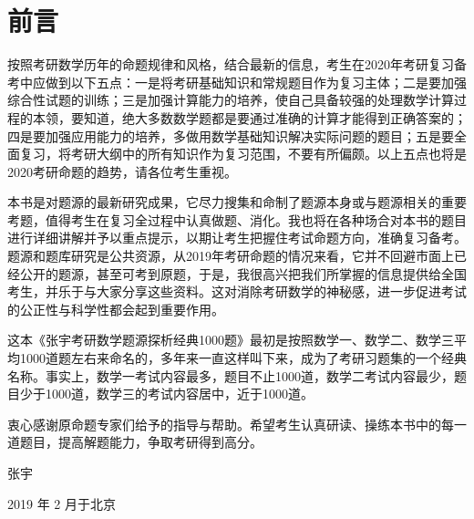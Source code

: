 	\onecolumn
	\chapter{前言}

	按照考研数学历年的命题规律和风格，结合最新的信息，考生在2020年考研复习备考中应做到以下五点：一是将考研基础知识和常规题目作为复习主体；二是要加强综合性试题的训练；三是加强计算能力的培养，使自己具备较强的处理数学计算过程的本领，要知道，绝大多数数学题都是要通过准确的计算才能得到正确答案的；四是要加强应用能力的培养，多做用数学基础知识解决实际问题的题目；五是要全面复习，将考研大纲中的所有知识作为复习范围，不要有所偏颇。以上五点也将是2020考研命题的趋势，请各位考生重视。

	本书是对题源的最新研究成果，它尽力搜集和命制了题源本身或与题源相关的重要考题，值得考生在复习全过程中认真做题、消化。我也将在各种场合对本书的题目进行详细讲解并予以重点提示，以期让考生把握住考试命题方向，准确复习备考。题源和题库研究是公共资源，从2019年考研命题的情况来看，它并不回避市面上已经公开的题源，甚至可考到原题，于是，我很高兴把我们所掌握的信息提供给全国考生，并乐于与大家分享这些资料。这对消除考研数学的神秘感，进一步促进考试的公正性与科学性都会起到重要作用。

	这本《张宇考研数学题源探析经典1000题》最初是按照数学一、数学二、数学三平均1000道题左右来命名的，多年来一直这样叫下来，成为了考研习题集的一个经典名称。事实上，数学一考试内容最多，题目不止1000道，数学二考试内容最少，题目少于1000道，数学三的考试内容居中，近于1000道。

	衷心感谢原命题专家们给予的指导与帮助。希望考生认真研读、操练本书中的每一道题目，提高解题能力，争取考研得到高分。

	\phantom{1}\hspace{\fill} {\LARGE 张宇}
	
	\phantom{1}\hspace{\fill} {2019 年 2 月\quad 于北京}
	\twocolumn